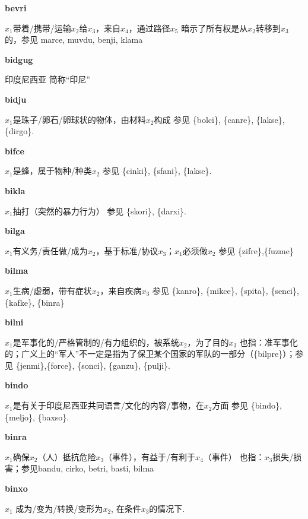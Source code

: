 \documentclass[notitlepage,twocolumn,a4paper,10pt]{book}
\begin{document}
{\sffamily\bfseries bevri}  $x_1$带着\slash{}携带\slash{}运输$x_2$给$x_3$，来自$x_4$，通过路径$x_5$ \textemdash{} 暗示了所有权是从$x_2$转移到$x_3$的，参见 {marce}, {muvdu}, {benji}, {klama}

{\sffamily\bfseries bidgug} 印度尼西亚 \textemdash{} 简称“印尼”

{\sffamily\bfseries bidju} $x_1$是珠子\slash{}卵石\slash{}卵球状的物体，由材料$x_2$构成 \textemdash{} 参见 \{bolci\}, \{canre\}, \{lakse\}, \{dirgo\}.

{\sffamily\bfseries bifce}\enspace {\ttfamily\bfseries[bic]}  $x_1$是蜂，属于物种\slash{}种类$x_2$ \textemdash{} 参见 \{cinki\}, \{sfani\}, \{lakse\}.

{\sffamily\bfseries bikla}\enspace {\ttfamily\bfseries[bik]}  $x_1$抽打（突然的暴力行为） \textemdash{} 参见 \{skori\}, \{darxi\}.

{\sffamily\bfseries bilga}\enspace {\ttfamily\bfseries[big]}  $x_1$有义务\slash{}责任做\slash{}成为$x_2$，基于标准\slash{}协议$x_3$；$x_1$必须做$x_2$ \textemdash{} 参见 \{zifre\},\{fuzme\}

{\sffamily\bfseries bilma}\enspace {\ttfamily\bfseries[        bi'a]}  $x_1$生病\slash{}虚弱，带有症状$x_2$，来自疾病$x_3$ \textemdash{} 参见 \{kanro\}, \{mikce\}, \{spita\}, \{senci\}, \{kafke\}, \{binra\}

{\sffamily\bfseries bilni}\enspace {\ttfamily\bfseries[bil]}  $x_1$是军事化的\slash{}严格管制的\slash{}有力组织的，被系统$x_2$，为了目的$x_3$ \textemdash{} 也指：准军事化的；广义上的“军人”不一定是指为了保卫某个国家的军队的一部分（\{bilpre\}）；参见 \{jenmi\},\{force\}, \{sonci\}, \{ganzu\}, \{pulji\}.

{\sffamily\bfseries bindo}\enspace {\ttfamily\bfseries[bid]}  $x_1$是有关于印度尼西亚共同语言\slash{}文化的内容\slash{}事物，在$x_2$方面 \textemdash{} 参见 \{bindo\}, \{meljo\}, \{baxso\}.

{\sffamily\bfseries binra} $x_1$确保$x_2$（人）抵抗危险$x_3$（事件），有益于\slash{}有利于$x_4$（事件） \textemdash{} 也指：$x_3$损失\slash{}损害；参见{bandu}, {cirko}, {betri}, {basti}, {bilma}

{\sffamily\bfseries binxo}\enspace {\ttfamily\bfseries[bix     bi'o]}  $x_1$ 成为\slash{}变为\slash{}转换\slash{}变形为$x_2$, 在条件$x_3$的情况下.
\end{document}

